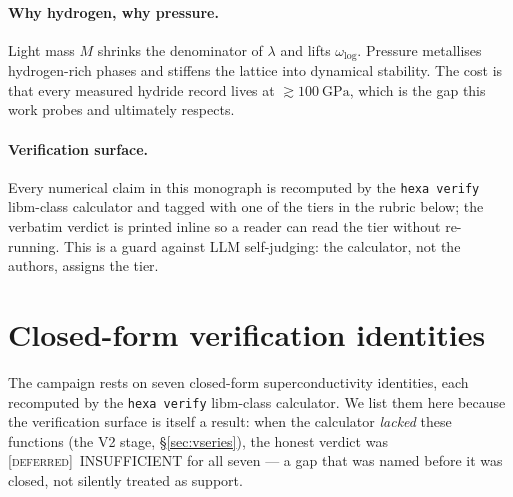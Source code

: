 \documentclass[11pt,a4paper]{article}
\newcommand{\tierOrange}{\textcolor{orange!85!black}{[\textsc{deferred}]}}
\begin{document}
\paragraph{Why hydrogen, why pressure.}
Light mass $M$ shrinks the denominator of $\lambda$ and lifts
$\omega_{\log}$. Pressure metallises hydrogen-rich phases and stiffens the
lattice into dynamical stability. The cost is that every measured hydride
record lives at $\gtrsim\SI{100}{\giga\pascal}$, which is the gap this work
probes and ultimately respects.

\paragraph{Verification surface.}
Every numerical claim in this monograph is recomputed by the
\texttt{hexa verify} libm-class calculator and tagged with one of the tiers
in the rubric below; the verbatim verdict is printed inline so a reader can
read the tier without re-running. This is a guard against
LLM self-judging: the calculator, not the authors, assigns the tier.

\section{Closed-form verification identities}
\label{sec:identities}

The campaign rests on seven closed-form superconductivity identities, each
recomputed by the \texttt{hexa verify} libm-class calculator. We list them
here because the verification surface is itself a result: when the calculator
\emph{lacked} these functions (the V2 stage, \S\ref{sec:vseries}), the honest
verdict was \tierOrange\ INSUFFICIENT for all seven --- a gap that was named
before it was closed, not silently treated as support.
\end{document}
